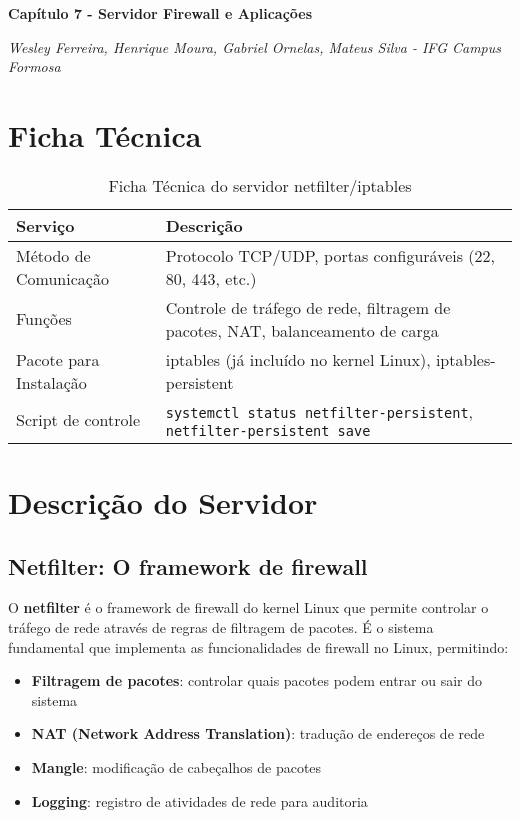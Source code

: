 ﻿\documentclass[12pt,fleqn]{article}
\begin{document}
\pagestyle{plain}
\setlength{\parindent}{0pt}
\setlength{\parskip}{6pt}  

\begin{center}
{\Large \textbf{Capítulo 7 - Servidor Firewall e Aplicações}}
\end{center}
\begin{center}
{\textit{Wesley Ferreira, Henrique Moura, Gabriel Ornelas, Mateus Silva - IFG Campus Formosa}}
\end{center}

\section{Ficha Técnica}  

\begin{table}[h]
\centering
\begin{tabular}{|p{3cm}|p{10cm}|}
	\hline
	\textbf{Serviço} & \textbf{Descrição}\\\hline 
	Método de Comunicação & Protocolo TCP/UDP, portas configuráveis (22, 80, 443, etc.) \\\hline
	Funções & Controle de tráfego de rede, filtragem de pacotes, NAT, balanceamento de carga\\\hline
	Pacote para Instalação & iptables (já incluído no kernel Linux), iptables-persistent\\\hline
	Script de controle & \texttt{systemctl status netfilter-persistent}, \texttt{netfilter-persistent save} \\\hline
\end{tabular}
\caption{Ficha Técnica do servidor netfilter/iptables}
\end{table}

\section{Descrição do Servidor}

\subsection{Netfilter: O framework de firewall}

O \textbf{netfilter} é o framework de firewall do kernel Linux que permite controlar o tráfego de rede através de regras de filtragem de pacotes. É o sistema fundamental que implementa as funcionalidades de firewall no Linux, permitindo:

\begin{itemize}
    \item \textbf{Filtragem de pacotes}: controlar quais pacotes podem entrar ou sair do sistema
    \item \textbf{NAT (Network Address Translation)}: tradução de endereços de rede
    \item \textbf{Mangle}: modificação de cabeçalhos de pacotes
    \item \textbf{Logging}: registro de atividades de rede para auditoria
\end{itemize}
\end{document}
